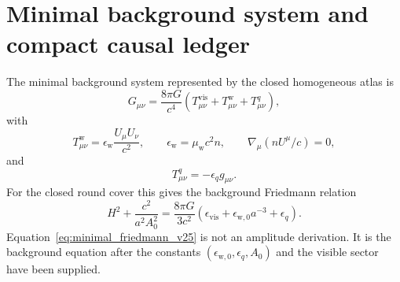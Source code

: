 \documentclass[
  aps,
  prd,
  reprint,
  superscriptaddress,
  floatfix,
  nofootinbib,
  longbibliography
]{revtex4-2}
\theoremstyle{plain}
\theoremstyle{definition}
\theoremstyle{remark}
\newcommand{\vis}{\mathrm{vis}}
\newcommand{\wind}{\mathrm w}
\newcommand{\eps}{\epsilon}
\begin{document}
\section{Minimal background system and compact causal ledger}

The minimal background system represented by the closed homogeneous atlas is
\begin{equation}
G_{\mu\nu}=\frac{8\pi G}{c^4}
\left(T^{\vis}_{\mu\nu}+T^{\wind}_{\mu\nu}+T^q_{\mu\nu}\right),
\label{eq:minimal_background_system_v25}
\end{equation}
with
\begin{equation}
T^{\wind}_{\mu\nu}=\eps_{\wind}\frac{U_\mu U_\nu}{c^2},
\qquad
\eps_{\wind}=\mu_{\wind}c^2 n,
\qquad
\nabla_\mu(nU^\mu/c)=0,
\label{eq:minimal_dust_system_v25}
\end{equation}
and
\begin{equation}
T^q_{\mu\nu}=-\eps_q g_{\mu\nu}.
\label{eq:minimal_vacuum_system_v25}
\end{equation}
For the closed round cover this gives the background Friedmann relation
\begin{equation}
H^2+\frac{c^2}{a^2A_0^2}
=
\frac{8\pi G}{3c^2}
\left(\eps_{\vis}+\eps_{\wind,0}a^{-3}+\eps_q\right).
\label{eq:minimal_friedmann_v25}
\end{equation}
Equation~\eqref{eq:minimal_friedmann_v25} is not an amplitude derivation.  It is
the background equation after the constants \((\eps_{\wind,0},\eps_q,A_0)\) and
the visible sector have been supplied.
\end{document}
